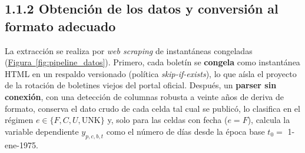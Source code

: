 \documentclass[12pt,letterpaper]{report}
\begin{document}
\subsection{1.1.2 Obtención de los datos y conversión al formato adecuado}

La extracción se realiza por \textit{web scraping} de instantáneas congeladas
(\hyperref[fig:pipeline_datos]{Figura~\ref*{fig:pipeline_datos}}). Primero, cada boletín se \textbf{congela} como instantánea HTML
en un respaldo versionado (política \textit{skip-if-exists}), lo que aísla el proyecto de la
rotación de boletines viejos del portal oficial. Después, un \textbf{parser sin conexión}, con una
detección de columnas robusta a veinte años de deriva de formato, conserva el dato crudo de cada
celda tal cual se publicó, lo clasifica en el régimen $e \in \{F, C, U, \text{UNK}\}$ y, solo para
las celdas con fecha ($e=F$), calcula la variable dependiente $y_{p,c,b,t}$ como el número de días
desde la época base $t_0 = $ 1-ene-1975.
\end{document}
